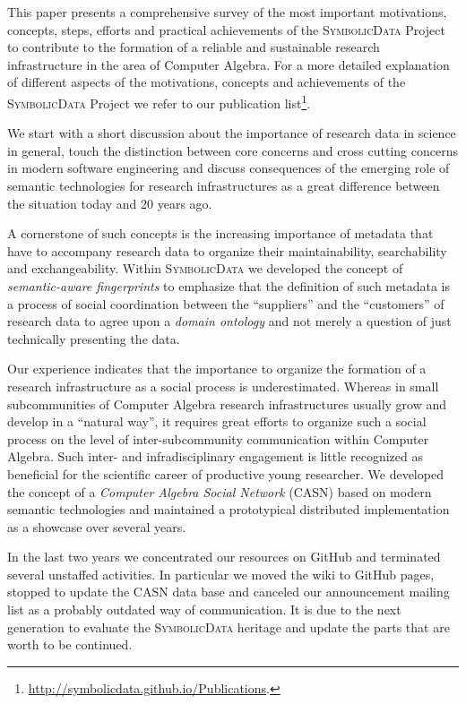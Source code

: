 \documentclass[12pt]{article}
\def\SD{\textsc{Sym\-bolic\-Data}}
\begin{document}
This paper presents a comprehensive survey of the most important motivations,
concepts, steps, efforts and practical achievements of the {\SD} Project to
contribute to the formation of a reliable and sustainable research
infrastructure in the area of Computer Algebra.  For a more detailed
explanation of different aspects of the motivations, concepts and achievements
of the {\SD} Project we refer to our publication
list\footnote{\url{http://symbolicdata.github.io/Publications}.}.

We start with a short discussion about the importance of research data in
science in general, touch the distinction between core concerns and cross
cutting concerns in modern software engineering and discuss consequences of the
emerging role of semantic technologies for research infrastructures as a great
difference between the situation today and 20 years ago.

A cornerstone of such concepts is the increasing importance of metadata that
have to accompany research data to organize their maintainability,
searchability and exchangeability. Within {\SD} we developed the concept of
\emph{semantic-aware fingerprints} to emphasize that the definition of such
metadata is a process of social coordination between the ``suppliers'' and the
``customers'' of research data to agree upon a \emph{domain ontology} and not
merely a question of just technically presenting the data.

Our experience indicates that the importance to organize the formation of a
research infrastructure as a social process is underestimated.  Whereas in
small subcommunities of Computer Algebra research infrastructures usually grow
and develop in a ``natural way'', it requires great efforts to organize such a
social process on the level of inter-subcommunity communication within Computer
Algebra.  Such inter- and infradisciplinary engagement is little recognized as
beneficial for the scientific career of productive young researcher. We
developed the concept of a \emph{Computer Algebra Social Network} (CASN)
\cite{cicm-14} based on modern semantic technologies and maintained a
prototypical distributed implementation as a showcase over several years.

In the last two years we concentrated our resources on GitHub and terminated
several unstaffed activities. In particular we moved the wiki to GitHub pages,
stopped to update the CASN data base and canceled our announcement mailing
list as a probably outdated way of communication.  It is due to the next
generation to evaluate the {\SD} heritage and update the parts that are worth
to be continued.
\end{document}

